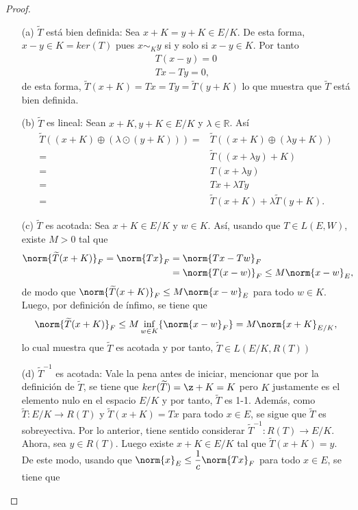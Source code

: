 \begin{proof}
\begin{enumerate}
    \begin{enumerate}
        \item[(a)] $\widetilde{T}$ está bien definida: Sea $x+K=y+K \in E/K$. De esta forma, $x-y\in K=ker(T)$ pues $x\sim_K y$ si y solo si $x-y\in K$. Por tanto
        \begin{align*}
            T(x-y)=0 \\ Tx-Ty=0,
        \end{align*}
        de esta forma, $\widetilde{T}(x+K)=Tx=Ty=\widetilde{T}(y+K)$ lo que muestra que $\widetilde{T}$ está bien definida.
        \item[(b)] $\widetilde{T}$ es lineal: Sean $x+K, y+K \in E/K$ y $\lambda\in \mathbb{R}$. Así
        \begin{align*}
            \widetilde{T}((x+K)\oplus(\lambda\odot(y+K))) =&\widetilde{T}((x+K)\oplus(\lambda y+K))\\=&\widetilde{T}((x+\lambda y)+K)\\=&T(x+\lambda y)\\=&Tx+\lambda Ty\\=&\widetilde{T}(x+K)+\lambda\widetilde{T}(y+K).
        \end{align*}
        \item[(c)]$\widetilde{T}$ es acotada: Sea $x+K \in E/K$ y $w \in K$. Así, usando que $T \in L(E,W)$, existe $M>0$ tal que
        \begin{align*}
            \norm{\widetilde{T}(x+K)}_F=\norm{Tx}_F&=\norm{Tx-Tw}_F \\&=\norm{T(x-w)}_F \leq M \norm{x-w}_E,
        \end{align*}
      de modo que $\norm{\widetilde{T}(x+K)}_F \leq M \norm{x-w}_E$ para todo $w \in K$. Luego, por definición de ínfimo, se tiene que
      \[
      \norm{\widetilde{T}(x+K)}_F\leq M \inf_{w\in K}\{\norm{x-w}_F\}=M\norm{x+K}_{E/K},
      \]
      lo cual muestra que $\widetilde{T}$ es acotada y por tanto, $\widetilde{T}\in L(E/K,R(T))$ 
      \item[(d)] $\widetilde{T}^{-1}$ es acotada: Vale la pena antes de iniciar, mencionar que por la definición de $\widetilde{T}$, se tiene que $ker(\widetilde{T})=\z+K=K$ pero $K$ justamente es el elemento nulo en el espacio $E/K$ y por tanto, $\widetilde{T}$ es 1-1. Además, como $\widetilde{T}:E/K \to R(T)$ y $\widetilde{T}(x+K)=Tx$ para todo $x\in E$, se sigue que $\widetilde{T}$ es sobreyectiva. Por lo anterior, tiene sentido considerar $\widetilde{T}^{-1}:R(T)\to E/K$. \\
      Ahora, sea $y \in R(T)$. Luego existe $x+K \in E/K$ tal que $\widetilde{T}(x+K)=y$. De este modo, usando que $\norm{x}_E\leq \dfrac{1}{c}\norm{Tx}_F$ para todo $x \in E$, se tiene que

\end{enumerate}
\end{enumerate}
\end{proof}
